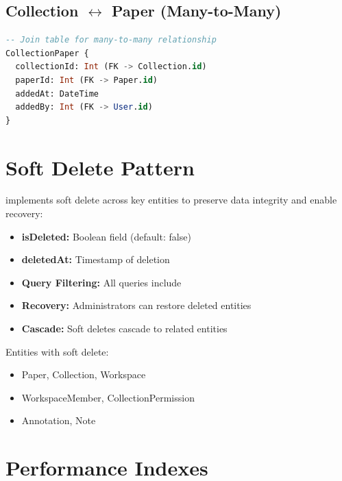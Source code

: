 \subsection{Collection \texorpdfstring{$\leftrightarrow$}{↔} Paper (Many-to-Many)}

\begin{lstlisting}[language=SQL, caption={Collection-Paper Many-to-Many}]
-- Join table for many-to-many relationship
CollectionPaper {
  collectionId: Int (FK -> Collection.id)
  paperId: Int (FK -> Paper.id)
  addedAt: DateTime
  addedBy: Int (FK -> User.id)
}
\end{lstlisting}

\section{Soft Delete Pattern}
\label{sec:erd-soft-delete}

\begin{infobox}
\projectname{} implements soft delete across key entities to preserve data integrity and enable recovery:

\begin{itemize}
    \item \textbf{isDeleted:} Boolean field (default: false)
    \item \textbf{deletedAt:} Timestamp of deletion
    \item \textbf{Query Filtering:} All queries include 
    \item \textbf{Recovery:} Administrators can restore deleted entities
    \item \textbf{Cascade:} Soft deletes cascade to related entities
\end{itemize}
\end{infobox}

Entities with soft delete:
\begin{itemize}
    \item Paper, Collection, Workspace
    \item WorkspaceMember, CollectionPermission
    \item Annotation, Note
\end{itemize}

\section{Performance Indexes}
\label{sec:erd-indexes}

